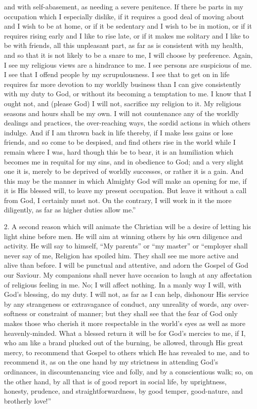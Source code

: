 and with self-abasement, as needing a severe penitence. If there be
parts in my occupation which I especially dislike, if it requires a
good deal of moving about and I wish to be at home, or if it be
sedentary and I wish to be in motion, or if it requires rising early
and I like to rise late, or if it makes me solitary and I like to be
with friends, all this unpleasant part, as far as is consistent with
my health, and so that it is not likely to be a snare to me, I will
choose by preference. Again, I see my religious views are a hindrance
to me. I see persons are suspicious of me. I see that I offend people
by my scrupulousness. I see that to get on in life requires far more
devotion to my worldly business than I can give consistently with my
duty to God, or without its becoming a temptation to me. I know that I
ought not, and (please God) I will not, sacrifice my religion to it.
My religious seasons and hours shall be my own. I will not countenance
any of the worldly dealings and practices, the over-reaching ways, the
sordid actions in which others indulge. And if I am thrown back in
life thereby, if I make less gains or lose friends, and so come to be
despised, and find others rise in the world while I remain where I
was, hard though this be to bear, it is an humiliation which becomes
me in requital for my sins, and in obedience to God; and a very slight
one it is, merely to be deprived of worldly successes, or rather it is
a gain. And this may be the manner in which Almighty God will make an
opening for me, if it is His blessed will, to leave my present
occupation. But leave it without a call from God, I certainly must
not. On the contrary, I will work in it the more diligently, as far as
higher duties allow me.''

2. A second reason which will animate the Christian will be a
desire of letting his light shine before men. He will aim at winning
others by his own diligence and activity. He will say to himself,
``My parents'' or ``my master'' or ``employer
shall never say of me, Religion has spoiled him. They shall see me
more active and alive than before. I will be punctual and attentive,
and adorn the Gospel of God our Saviour. My companions shall never
have occasion to laugh at any affectation of religious feeling in me.
No; I will affect nothing. In a manly way I will, with God's blessing,
do my duty. I will not, as far as I can help, dishonour His service by
any strangeness or extravagance of conduct, any unreality of words,
any over-softness or constraint of manner; but they shall see that the
fear of God only makes those who cherish it more respectable in the
world's eyes as well as more heavenly-minded. What a blessed return it
will be for God's mercies to me, if I, who am like a brand plucked out
of the burning, be allowed, through His great mercy, to recommend that
Gospel to others which He has revealed to me, and to recommend it, as
on the one hand by my strictness in attending God's ordinances, in
discountenancing vice and folly, and by a conscientious walk; so, on
the other hand, by all that is of good report in social life, by
uprightness, honesty, prudence, and straightforwardness, by good
temper, good-nature, and brotherly love!''

